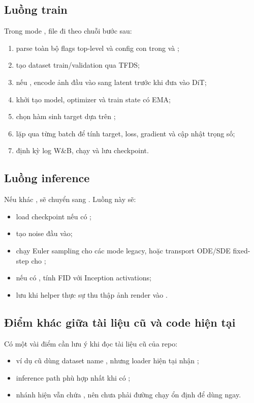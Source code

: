 \subsection{Luồng train}

Trong mode , file  đi theo chuỗi bước sau:

\begin{enumerate}
    \item parse toàn bộ flags top-level và config con trong  và ;
    \item tạo dataset train/validation qua TFDS;
    \item nếu , encode ảnh đầu vào sang latent trước khi đưa vào DiT;
    \item khởi tạo model, optimizer  và train state có EMA;
    \item chọn hàm sinh target dựa trên ;
    \item lặp qua từng batch để tính target, loss, gradient và cập nhật trọng số;
    \item định kỳ log W\&B, chạy  và lưu checkpoint.
\end{enumerate}

\subsection{Luồng inference}

Nếu  khác ,  sẽ chuyển sang .
Luồng này sẽ:

\begin{itemize}
    \item load checkpoint nếu có ;
    \item tạo noise đầu vào;
    \item chạy Euler sampling cho các mode legacy, hoặc transport ODE/SDE fixed-step cho ;
    \item nếu có , tính FID với Inception activations;
    \item lưu  khi helper thực sự thu thập ảnh render vào .
\end{itemize}

\subsection{Điểm khác giữa tài liệu cũ và code hiện tại}

Có một vài điểm cần lưu ý khi đọc tài liệu cũ của repo:

\begin{itemize}
    \item ví dụ cũ dùng dataset name , nhưng loader hiện tại nhận ;
    \item inference path phù hợp nhất khi có ;
    \item nhánh  hiện vẫn chứa , nên chưa phải đường chạy ổn định để dùng ngay.
\end{itemize}
